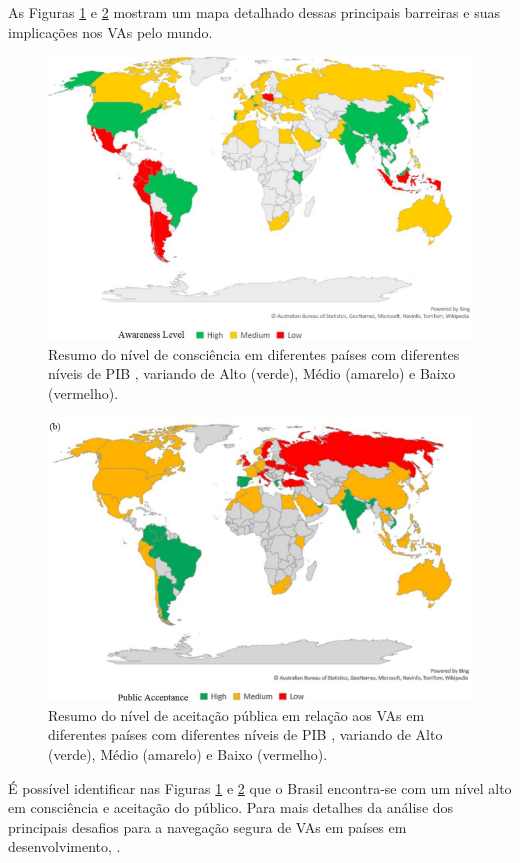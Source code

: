 As Figuras \ref{awareness} e \ref{public} mostram um mapa detalhado dessas principais barreiras e suas implicações nos VAs pelo mundo.
\begin{figure}[H]
\centering
\includegraphics[width=12cm]{Figures/grafik-a.png}
\caption{Resumo do nível de consciência em diferentes países com diferentes níveis de PIB \cite{mundobrasil}, variando de Alto (verde), Médio (amarelo) e Baixo (vermelho).}
\label{awareness}
\end{figure}

\begin{figure}[H]
\centering
\includegraphics[width=12cm]{Figures/grafik-b.png}
\caption{Resumo do nível de aceitação pública em relação aos VAs em diferentes países com diferentes níveis de PIB \cite{mundobrasil}, variando de Alto (verde), Médio (amarelo) e Baixo (vermelho).}
\label{public}
\end{figure}

É possível identificar nas Figuras \ref{awareness} e \ref{public} que o Brasil encontra-se com um nível alto em consciência e aceitação do público. Para mais detalhes da análise dos principais desafios para a navegação segura de VAs em países em desenvolvimento, \cite{mundobrasil}.

